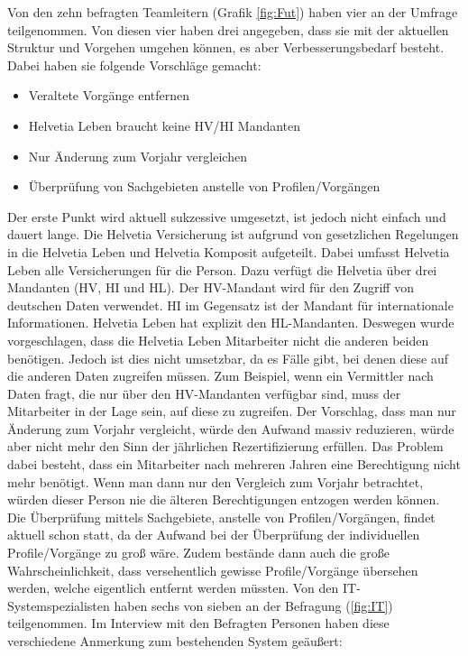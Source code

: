 \newpage
Von den zehn befragten Teamleitern (Grafik \ref{fig:Fut}) haben vier an der Umfrage teilgenommen.
Von diesen vier haben drei angegeben, dass sie mit der aktuellen Struktur und Vorgehen umgehen können, es aber Verbesserungsbedarf besteht.
Dabei haben sie folgende Vorschläge gemacht:

\begin{itemize}
	\item Veraltete Vorgänge entfernen
	\item Helvetia Leben braucht keine HV/HI Mandanten
	\item Nur Änderung zum Vorjahr vergleichen
	\item Überprüfung von Sachgebieten anstelle von Profilen/Vorgängen
\end{itemize}

Der erste Punkt wird aktuell sukzessive umgesetzt, ist jedoch nicht einfach und dauert lange.
Die Helvetia Versicherung ist aufgrund von gesetzlichen Regelungen in die Helvetia Leben und Helvetia Komposit aufgeteilt.
Dabei umfasst Helvetia Leben alle Versicherungen für die Person.
Dazu verfügt die Helvetia über drei Mandanten (HV, HI und HL).
Der HV-Mandant wird für den Zugriff von deutschen Daten verwendet.
HI im Gegensatz ist der Mandant für internationale Informationen.
Helvetia Leben hat explizit den HL-Mandanten.
Deswegen wurde vorgeschlagen, dass die Helvetia Leben Mitarbeiter nicht die anderen beiden benötigen.
Jedoch ist dies nicht umsetzbar, da es Fälle gibt, bei denen diese auf die anderen Daten zugreifen müssen.
Zum Beispiel, wenn ein Vermittler nach Daten fragt, die nur über den HV-Mandanten verfügbar sind, muss der Mitarbeiter in der Lage sein, auf diese zu zugreifen.
\newline
Der Vorschlag, dass man nur Änderung zum Vorjahr vergleicht, würde den Aufwand massiv reduzieren, würde aber nicht mehr den Sinn der jährlichen Rezertifizierung erfüllen.
Das Problem dabei besteht, dass ein Mitarbeiter nach mehreren Jahren eine Berechtigung nicht mehr benötigt.
Wenn man dann nur den Vergleich zum Vorjahr betrachtet, würden dieser Person nie die älteren Berechtigungen entzogen werden können.
\newline
Die Überprüfung mittels Sachgebiete, anstelle von Profilen/Vorgängen, findet aktuell schon statt, da der Aufwand bei der Überprüfung der individuellen Profile/Vorgänge zu groß wäre.
Zudem bestände dann auch die große Wahrscheinlichkeit, dass versehentlich gewisse Profile/Vorgänge übersehen werden, welche eigentlich entfernt werden müssten.
\newline
\newline
Von den IT-Systemspezialisten haben sechs von sieben an der Befragung (\ref{fig:IT}) teilgenommen.
Im Interview mit den Befragten Personen haben diese verschiedene Anmerkung zum bestehenden System geäußert:

